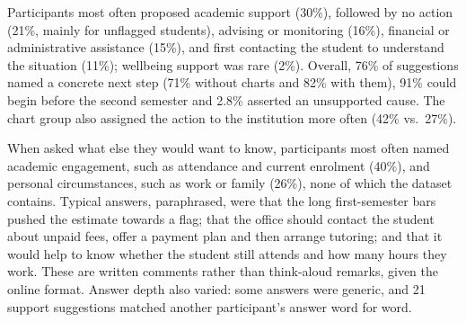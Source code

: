 Participants most often proposed academic support (30\%), followed by no action (21\%, mainly for
unflagged students), advising or monitoring (16\%), financial or administrative assistance (15\%),
and first contacting the student to understand the situation (11\%); wellbeing support was rare
(2\%). Overall, 76\% of suggestions named a concrete next step (71\% without charts and 82\% with
them), 91\% could begin before the second semester and 2.8\% asserted an unsupported cause. The chart
group also assigned the action to the institution more often (42\% vs.\ 27\%).

When asked what else they would want to know, participants most often named academic engagement,
such as attendance and current enrolment (40\%), and personal circumstances, such as work or family
(26\%), none of which the dataset contains. Typical answers, paraphrased, were that the long
first-semester bars pushed the estimate towards a flag; that the office should contact the student
about unpaid fees, offer a payment plan and then arrange tutoring; and that it would help to know
whether the student still attends and how many hours they work. These are written comments rather
than think-aloud remarks, given the online format. Answer depth also varied: some answers were
generic, and 21 support suggestions matched another participant's answer word for word.
